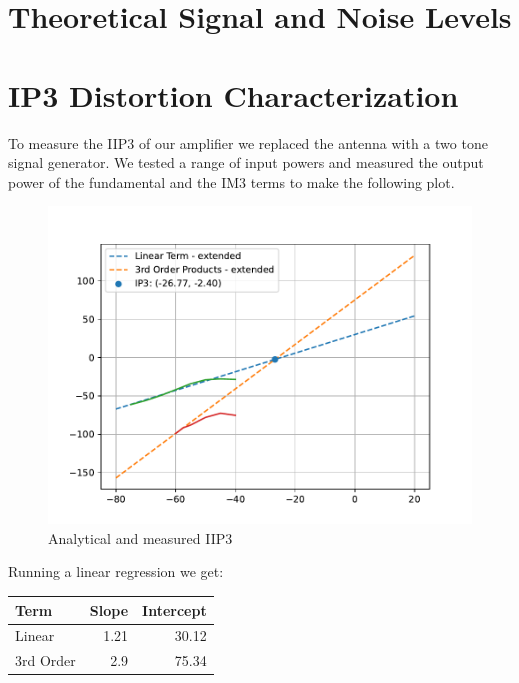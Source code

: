 \documentclass[letterpaper,12pt]{article}
\begin{document}
\newpage
\section{Theoretical Signal and Noise Levels}

\newpage
\section{IP3 Distortion Characterization}
To measure the IIP3 of our amplifier we replaced the antenna with a two tone signal generator. We tested a range of input powers and measured the output power of the fundamental and the IM3 terms to make the following plot.
\begin{figure}[H]
	\begin{centering}
		\includegraphics[width=0.7\columnwidth]{figures/iip3_regression.pdf}
		\caption{Analytical and measured IIP3}
	\end{centering}
\end{figure}
Running a linear regression we get:
\\
\begin{center}
	\begin{tabular}{lrr}
		\toprule
		Term & Slope & Intercept \\
		\midrule
		Linear & 1.21 & 30.12 \\
		3rd Order & 2.9 & 75.34 \\
		\bottomrule
	\end{tabular}
\end{center}
\end{document}
